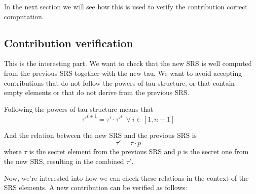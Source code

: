 \documentclass{article}
\begin{document}
In the next section we will see how this is used to verify the contribution correct computation.


\subsection{Contribution verification}
This is the interesting part. We want to check that the new SRS is well computed from the previous SRS together with the new tau. We want to avoid accepting contributions that do not follow the powers of tau structure, or that contain empty elements or that do not derive from the previous SRS.

Following the powers of tau structure means that
$$\tau'^{i+1} = \tau' \cdot \tau'^i ~~\forall~i \in [1, n-1]$$

And the relation between the new SRS and the previous SRS is
$$\tau' = \tau \cdot p$$
where $\tau$ is the secret element from the previous SRS and $p$ is the secret one from the new SRS, resulting in the combined $\tau'$.

Now, we're interested into how we can check these relations in the context of the SRS elements. A new contribution can be verified as follows:
\end{document}
